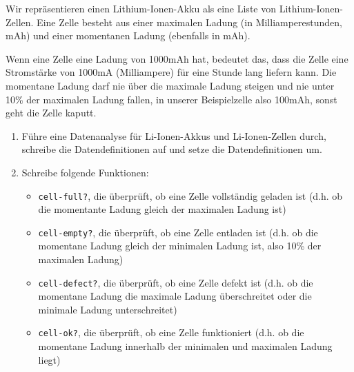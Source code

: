 \begin{aufgabe}
  Wir repräsentieren einen Lithium-Ionen-Akku als
  eine Liste von Lithium-Ionen-Zellen.  Eine Zelle besteht aus einer
  maximalen Ladung (in Milliamperestunden, mAh) und einer momentanen
  Ladung (ebenfalls in mAh).

  Wenn eine Zelle eine Ladung von 1000mAh hat, bedeutet das, dass die
  Zelle eine Stromstärke von 1000mA (Milliampere) für eine Stunde lang
  liefern kann.  Die momentane Ladung darf nie über die maximale
  Ladung steigen und nie unter 10\% der maximalen Ladung fallen, in
  unserer Beispielzelle also 100mAh, sonst geht die Zelle kaputt.

  
  \begin{enumerate}
    \setlength{\itemsep}{1cm}
  \item Führe eine Datenanalyse für Li-Ionen-Akkus und
    Li-Ionen-Zellen durch, schreibe die Datendefinitionen auf und
    setze die Datendefinitionen um.

  \item Schreibe folgende Funktionen:

    \begin{itemize}
    \item \texttt{cell-full?}, die überprüft, ob eine
      Zelle vollständig geladen ist (d.h. ob die momentante
      Ladung gleich der maximalen Ladung ist)

    \item \texttt{cell-empty?}, die überprüft, ob eine Zelle entladen
      ist (d.h. ob die momentane Ladung gleich der minimalen Ladung
      ist, also 10\% der maximalen Ladung)

    \item \texttt{cell-defect?}, die überprüft, ob eine
      Zelle defekt ist (d.h. ob die momentane Ladung die
      maximale Ladung überschreitet oder die minimale Ladung
      unterschreitet)

    \item \texttt{cell-ok?}, die überprüft, ob eine
      Zelle funktioniert (d.h. ob die momentane Ladung
      innerhalb der minimalen und maximalen Ladung liegt)

    \end{itemize}


\end{enumerate}
\end{aufgabe}
